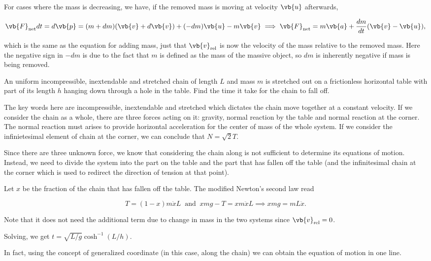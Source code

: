\documentclass[a4paper,12pt]{report}
\begin{document}
For cases where the mass is decreasing, we have, if the removed mass is moving at velocity \(\vb{u} \) afterwards, 

\begin{equation}
	\vb{F} _{\text{net} } dt = d\vb{p} = (m+dm)(\vb{v} +d\vb{v} ) + (-dm)\vb{u}  - m\vb{v} \implies \vb{F} _{\text{net} } = m\vb{a} + \frac{dm}{dt} (\vb{v} - \vb{u} ),    
\end{equation}

which is the same as the equation for adding mass, just that \(\vb{v} _{\text{rel} } \) is now the velocity of the mass relative to the removed mass. Here the negative sign in \(-dm\) is due to the fact that \(m\) is defined as the mass of the massive object, so \(dm\) is inherently negative if mass is being removed.   


{An uniform incompressible, inextendable and stretched chain of length \(L\) and mass \(m\) is stretched out on a frictionless horizontal table with part of its length \(h\) hanging down through a hole in the table. Find the time it take for the chain to fall off.}
{The key words here are incompressible, inextendable and stretched which dictates the chain move together at a constant velocity. If we consider the chain as a whole, there are three forces acting on it: gravity, normal reaction by the table and normal reaction at the corner. The normal reaction must arises to provide horizontal acceleration for the center of mass of the whole system. If we consider the infinietesimal element of chain at the corner, we can conclude that \(N = \sqrt{2}T \).   
	
Since there are three unknown force, we know that considering the chain along is not sufficient to determine its equations of motion. Instead, we need to divide the system into the part on the table and the part that has fallen off the table (and the infinitesimal chain at the corner which is used to redirect the direction of tension at that point). 

Let \(x\) be the fraction of the chain that has fallen off the table. The modified Newton's second law read

\begin{equation}
	T = (1-x)m \ddot{x}L ~\text { and }~ xmg - T = xm \ddot{x}L \implies xmg = mL \ddot{x}.   
\end{equation}

Note that it does not need the additional term due to change in mass in the two systems since \(\vb{v} _{\text{rel} }  = 0\). 

Solving, we get \(t = \sqrt{L /g } \cosh^{-1} \left( L /h  \right) \). 

In fact, using the concept of generalized coordinate (in this case, along the chain) we can obtain the equation of motion in one line.


} 
\end{document}
